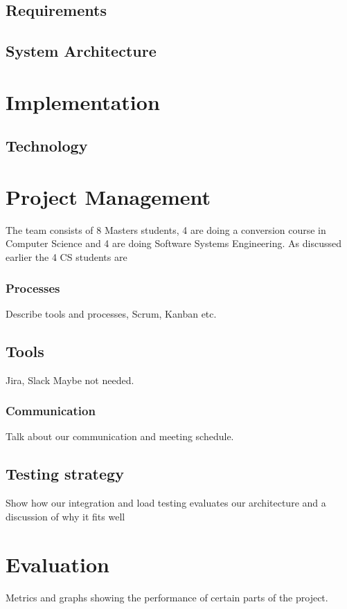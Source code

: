 \documentclass[prodmode,acmtecs]{acmsmall} %
\begin{document}
\subsection{Requirements}

\subsection{System Architecture}

\section{Implementation}

\subsection{Technology}


\section{Project Management}
The team consists of 8 Masters students, 4 are doing a conversion course in Computer Science and 4 are doing Software Systems Engineering. As discussed earlier the 4 CS students are
\subsubsection{Processes}
Describe tools and processes, Scrum, Kanban etc.


\subsection{Tools}
Jira, Slack Maybe not needed.

\subsubsection{Communication}
Talk about our communication and meeting schedule.


\subsection{Testing strategy}
Show how our integration and load testing evaluates our architecture and a discussion of why it fits well

\section{Evaluation}
Metrics and graphs showing the performance of certain parts of the project.
\end{document}
